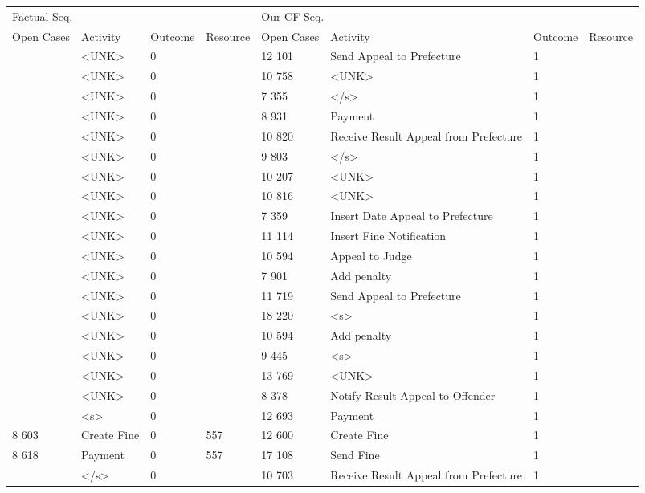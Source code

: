 \begin{tabular}{llllllll}
\toprule
\multicolumn{4}{l}{Factual Seq.} & \multicolumn{4}{l}{Our CF Seq.} \\
Open Cases & Activity & Outcome & Resource & Open Cases & Activity & Outcome & Resource \\
\midrule
 & <UNK> & 0 &  & 12 101 & Send Appeal to Prefecture & 1 &  \\
 & <UNK> & 0 &  & 10 758 & <UNK> & 1 &  \\
 & <UNK> & 0 &  & 7 355 & </s> & 1 &  \\
 & <UNK> & 0 &  & 8 931 & Payment & 1 &  \\
 & <UNK> & 0 &  & 10 820 & Receive Result Appeal from Prefecture & 1 &  \\
 & <UNK> & 0 &  & 9 803 & </s> & 1 &  \\
 & <UNK> & 0 &  & 10 207 & <UNK> & 1 &  \\
 & <UNK> & 0 &  & 10 816 & <UNK> & 1 &  \\
 & <UNK> & 0 &  & 7 359 & Insert Date Appeal to Prefecture & 1 &  \\
 & <UNK> & 0 &  & 11 114 & Insert Fine Notification & 1 &  \\
 & <UNK> & 0 &  & 10 594 & Appeal to Judge & 1 &  \\
 & <UNK> & 0 &  & 7 901 & Add penalty & 1 &  \\
 & <UNK> & 0 &  & 11 719 & Send Appeal to Prefecture & 1 &  \\
 & <UNK> & 0 &  & 18 220 & <s> & 1 &  \\
 & <UNK> & 0 &  & 10 594 & Add penalty & 1 &  \\
 & <UNK> & 0 &  & 9 445 & <s> & 1 &  \\
 & <UNK> & 0 &  & 13 769 & <UNK> & 1 &  \\
 & <UNK> & 0 &  & 8 378 & Notify Result Appeal to Offender & 1 &  \\
 & <s> & 0 &  & 12 693 & Payment & 1 &  \\
8 603 & Create Fine & 0 & 557 & 12 600 & Create Fine & 1 &  \\
8 618 & Payment & 0 & 557 & 17 108 & Send Fine & 1 &  \\
 & </s> & 0 &  & 10 703 & Receive Result Appeal from Prefecture & 1 &  \\
\bottomrule
\end{tabular}
